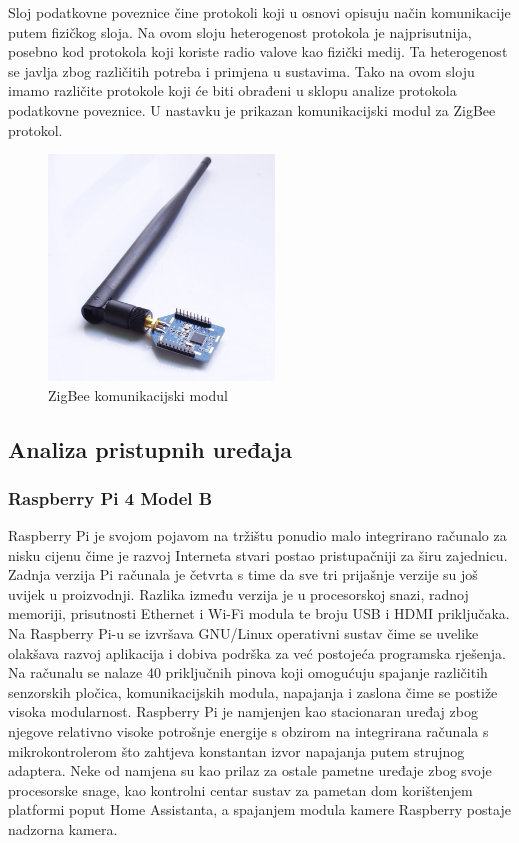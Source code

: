 \documentclass[times, utf8, diplomski]{fer}
\begin{document}
Sloj podatkovne poveznice čine protokoli koji u osnovi opisuju način komunikacije putem fizičkog sloja. Na ovom sloju heterogenost protokola je najprisutnija, posebno kod protokola koji koriste radio valove kao fizički medij. Ta heterogenost se javlja zbog različitih potreba i primjena u sustavima. Tako na ovom sloju imamo različite protokole koji će biti obrađeni u sklopu analize protokola podatkovne poveznice. U nastavku je prikazan komunikacijski modul za ZigBee protokol.
\begin{figure}[htb]
    \centering
    \includegraphics[width=6cm]{images/zigbee-module.jpg}
    \caption{ZigBee komunikacijski modul\citep{ZigBeemodule}}
    \label{fig:zigbeemodule}
\end{figure}

\subsection{Analiza pristupnih uređaja}
\subsubsection{Raspberry Pi 4 Model B}
Raspberry Pi je svojom pojavom na tržištu ponudio malo integrirano računalo za nisku cijenu čime je razvoj Interneta stvari postao pristupačniji za širu zajednicu. Zadnja verzija Pi računala je četvrta s time da sve tri prijašnje verzije su još uvijek u proizvodnji. Razlika između verzija je u procesorskoj snazi, radnoj memoriji, prisutnosti Ethernet i Wi-Fi modula te broju USB i HDMI priključaka. Na Raspberry Pi-u se izvršava GNU/Linux operativni sustav čime se uvelike olakšava razvoj aplikacija i dobiva podrška za već postojeća programska rješenja. Na računalu se nalaze 40 priključnih pinova koji omogućuju spajanje različitih senzorskih pločica, komunikacijskih modula, napajanja i zaslona čime se postiže visoka modularnost. Raspberry Pi je namjenjen kao stacionaran uređaj zbog njegove relativno visoke potrošnje energije s obzirom na integrirana računala s mikrokontrolerom što zahtjeva konstantan izvor napajanja putem strujnog adaptera. Neke od namjena su kao prilaz za ostale pametne uređaje zbog svoje procesorske snage, kao kontrolni centar sustav za pametan dom korištenjem platformi poput Home Assistanta, a spajanjem modula kamere Raspberry postaje nadzorna kamera. 
\end{document}
